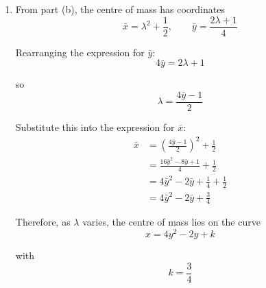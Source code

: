 \documentclass[leqno]{article}
\begin{document}
\begin{enumerate}[
  label=\textbf{\arabic*.},
  leftmargin=*,
  topsep=0pt,
  partopsep=0pt,
  parsep=0pt
]
\begin{djsSolution}
\begin{enumerate}[label=\textbf{(\alph*)}, start=1]
  Hence the centre of mass is
  \[
  \left(\lambda^2+\frac12,\,\frac{2\lambda+1}{4}\right)
  \]

  \item From part (b), the centre of mass has coordinates
  \[
  \bar{x}=\lambda^2+\frac12,
  \qquad
  \bar{y}=\frac{2\lambda+1}{4}
  \]

  Rearranging the expression for $\bar{y}$:
  \[
  4\bar{y}=2\lambda+1
  \]

  so
  \[
  \lambda=\frac{4\bar{y}-1}{2}
  \]

  Substitute this into the expression for $\bar{x}$:
  \begin{align*}
  \bar{x}&=\left(\frac{4\bar{y}-1}{2}\right)^2+\frac12 \\
   &=\frac{16\bar{y}^2-8\bar{y}+1}{4}+\frac12 \\
   &=4\bar{y}^2-2\bar{y}+\frac14+\frac12 \\
   &=4\bar{y}^2-2\bar{y}+\frac34
  \end{align*}

  Therefore, as $\lambda$ varies, the centre of mass lies on the curve
  \[
  x=4y^2-2y+k
  \]

  with
  \[
  k=\frac34
  \]
\end{enumerate}
\end{djsSolution}


\end{enumerate}
\end{document}
